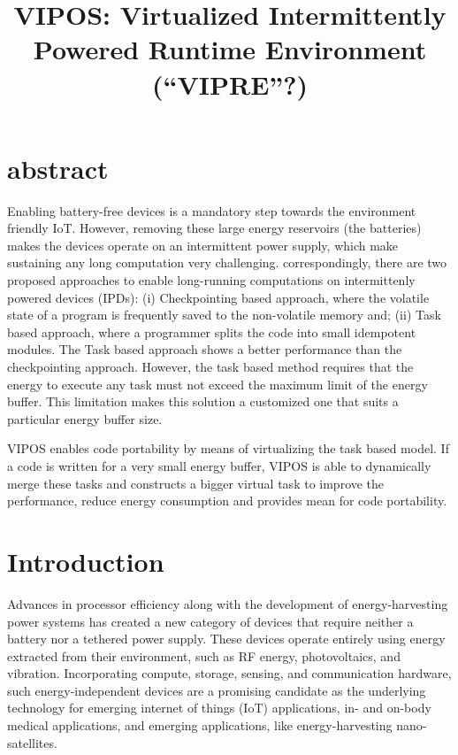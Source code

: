 \documentclass[sigconf,anonymous,review]{acmart}
\begin{document}
\title{VIPOS: Virtualized Intermittently Powered Runtime Environment (``VIPRE''?)}



\maketitle

\section{abstract}
Enabling battery-free devices is a mandatory step towards the environment friendly IoT. However, removing these large energy reservoirs (the batteries) makes the devices operate on an intermittent power supply, which make sustaining any long computation very challenging. correspondingly, there are two proposed approaches to enable long-running computations on intermittenly powered devices (IPDs): (i) Checkpointing based approach, where the volatile state of a program is frequently saved to the non-volatile memory and; (ii)  Task based approach, where a programmer splits the code into small idempotent modules. The Task based approach shows a better performance than the checkpointing approach. However, the task based method requires that the energy to execute any task must not exceed the maximum limit of the energy buffer. This limitation makes this solution a customized one that suits a particular energy buffer size. 

VIPOS enables code portability by means of virtualizing the task based model. If a code is written for a very small energy buffer, VIPOS is able to dynamically merge these tasks and constructs a bigger virtual task to improve the performance, reduce energy consumption and provides mean for code portability. 

\section{Introduction}
\label{sec:intro}

Advances in processor efficiency along with the development of
energy-harvesting power systems has created a new category of devices that
require neither a battery nor a tethered power supply.  These devices operate
entirely using energy extracted from their environment, such as RF energy,
photovoltaics, and vibration.  Incorporating compute, storage, sensing, and
communication hardware, such energy-independent devices are a promising
candidate as the underlying technology for emerging internet of things (IoT)
applications, in- and on-body medical applications, and emerging applications,
like energy-harvesting nano-satellites.  
\end{document}
